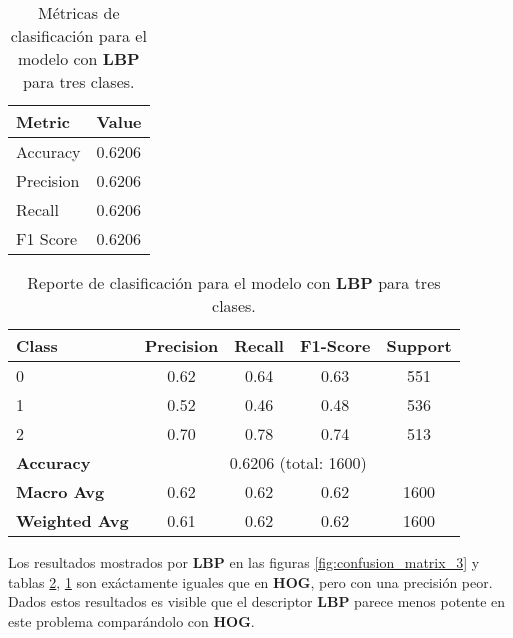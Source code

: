 \documentclass[12pt,letterpaper]{article}
\begin{document}
\begin{table}[htp]
    \centering
    \begin{tabular}{ll}
    \hline
    \textbf{Metric} & \textbf{Value} \\
    \hline
    Accuracy    & 0.6206 \\
    Precision   & 0.6206 \\
    Recall      & 0.6206 \\
    F1 Score    & 0.6206 \\
    \hline
    \end{tabular}
    \caption{Métricas de clasificación para el modelo con \textbf{LBP} para tres clases.}
    \label{tab:classification_metrics_lbp3}
\end{table}

\begin{table}[htp]
    \centering
    \begin{tabular}{lcccc}
    \hline
    \textbf{Class} & \textbf{Precision} & \textbf{Recall} & \textbf{F1-Score} & \textbf{Support} \\
    \hline
    0 & 0.62 & 0.64 & 0.63 & 551 \\
    1 & 0.52 & 0.46 & 0.48 & 536 \\
    2 & 0.70 & 0.78 & 0.74 & 513 \\
    \hline
    \textbf{Accuracy} & \multicolumn{4}{c}{0.6206 (total: 1600)} \\
    \textbf{Macro Avg} & 0.62 & 0.62 & 0.62 & 1600 \\
    \textbf{Weighted Avg} & 0.61 & 0.62 & 0.62 & 1600 \\
    \hline
    \end{tabular}
    \caption{Reporte de clasificación para el modelo con \textbf{LBP} para tres clases.}
    \label{tab:classification_report_lbp3}
\end{table}

Los resultados mostrados por \textbf{LBP} en las figuras \ref{fig:confusion_matrix_3} y tablas \ref{tab:classification_report_lbp3}, \ref{tab:classification_metrics_lbp3} son exáctamente iguales que en \textbf{HOG}, pero con una precisión peor.\\[6pt]
Dados estos resultados es visible que el descriptor \textbf{LBP} parece menos potente en este problema comparándolo con \textbf{HOG}.
\end{document}
